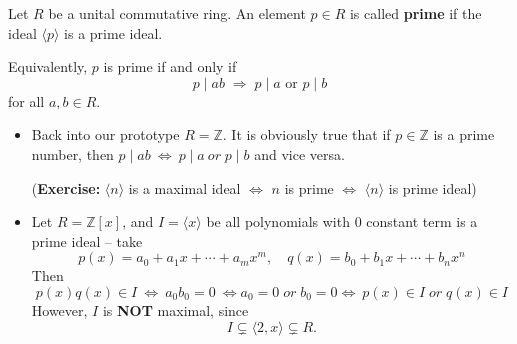 \begin{definition}
Let $R$ be a unital commutative ring. An element $p \in R$ is called 
\textbf{prime} if the ideal $\langle p \rangle$ is a prime ideal.

Equivalently, $p$ is prime if and only if
\[
p \mid ab \;\Longrightarrow\; p \mid a \text{ or } p \mid b
\]
for all $a,b \in R$.
\end{definition}




\begin{example}
\begin{itemize}
    \item Back into our prototype $R=\mathbb{Z}$. 
    It is obviously true that if $p \in \mathbb{Z}$ is a prime number, then $p\mid ab\ \Leftrightarrow \ p\mid a\ or\; p\mid b$ and vice versa.
    
    (\textbf{Exercise:} $\langle n\rangle$ is a maximal ideal $\Leftrightarrow$ $n$ is prime $\Leftrightarrow$ $\langle n\rangle$ is prime ideal)
    
    \item Let $R=\mathbb{Z}[x]$, and $I=\langle x\rangle$ be all polynomials with $0$ constant term is a prime ideal -- 
    take 
    $$p(x)=a_0+a_1x+\cdots+a_mx^m,\quad  q(x)=b_0+b_1x+\cdots+b_nx^n$$ 
    Then 
    $$p(x)q(x)\in I\ \Leftrightarrow\ a_0b_0=0\ \Leftrightarrow a_0=0\; or \; b_0=0\Leftrightarrow\ p(x)\in I\;or\; q(x)\in I$$
    However, $I$ is \textbf{NOT} maximal, since
    $$I\subsetneq \langle 2,x\rangle\subsetneq R.$$
\end{itemize}
\end{example}

